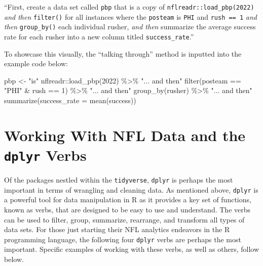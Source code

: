 \documentclass[
  letterpaper,
]{krantz}
\newenvironment{Shaded}{\begin{snugshade}}{\end{snugshade}}
\newcommand{\AttributeTok}[1]{\textcolor[rgb]{0.40,0.45,0.13}{#1}}
\newcommand{\DecValTok}[1]{\textcolor[rgb]{0.68,0.00,0.00}{#1}}
\newcommand{\FunctionTok}[1]{\textcolor[rgb]{0.28,0.35,0.67}{#1}}
\newcommand{\NormalTok}[1]{\textcolor[rgb]{0.00,0.23,0.31}{#1}}
\newcommand{\OtherTok}[1]{\textcolor[rgb]{0.00,0.23,0.31}{#1}}
\newcommand{\SpecialCharTok}[1]{\textcolor[rgb]{0.37,0.37,0.37}{#1}}
\newcommand{\StringTok}[1]{\textcolor[rgb]{0.13,0.47,0.30}{#1}}
\begin{document}
``First, create a data set called \texttt{pbp} that is a copy of
\texttt{nflreadr::load\_pbp(2022)} \emph{and then} \texttt{filter()} for
all instances where the \texttt{posteam} is \texttt{PHI} and
\texttt{rush\ ==\ 1} \emph{and then} \texttt{group\_by()} each
individual rusher, \emph{and then} summarize the average success rate
for each rusher into a new column titled \texttt{success\_rate}.''

To showcase this visually, the ``talking through'' method is inputted
into the example code below:

\begin{Shaded}
\begin{Highlighting}[]
\NormalTok{pbp }\OtherTok{\textless{}{-}} \StringTok{"is"}\NormalTok{ nflreadr}\SpecialCharTok{::}\FunctionTok{load\_pbp}\NormalTok{(}\DecValTok{2022}\NormalTok{) }\SpecialCharTok{\%\textgreater{}\%} \StringTok{"... and then"}
  \FunctionTok{filter}\NormalTok{(posteam }\SpecialCharTok{==} \StringTok{"PHI"} \SpecialCharTok{\&}\NormalTok{ rush }\SpecialCharTok{==} \DecValTok{1}\NormalTok{) }\SpecialCharTok{\%\textgreater{}\%} \StringTok{"... and then"}
  \FunctionTok{group\_by}\NormalTok{(rusher) }\SpecialCharTok{\%\textgreater{}\%} \StringTok{"... and then"}
  \FunctionTok{summarize}\NormalTok{(}\AttributeTok{success\_rate =} \FunctionTok{mean}\NormalTok{(success))}
\end{Highlighting}
\end{Shaded}

\hypertarget{working-with-nfl-data-and-the-dplyr-verbs}{%
\section{\texorpdfstring{Working With NFL Data and the \texttt{dplyr}
Verbs}{Working With NFL Data and the dplyr Verbs}}\label{working-with-nfl-data-and-the-dplyr-verbs}}

Of the packages nestled within the \texttt{tidyverse}, \texttt{dplyr} is
perhaps the most important in terms of wrangling and cleaning data. As
mentioned above, \texttt{dplyr} is a powerful tool for data manipulation
in R as it provides a key set of functions, known as verbs, that are
designed to be easy to use and understand. The verbs can be used to
filter, group, summarize, rearrange, and transform all types of data
sets. For those just starting their NFL analytics endeavors in the R
programming language, the following four \texttt{dplyr} verbs are
perhaps the most important. Specific examples of working with these
verbs, as well as others, follow below.
\end{document}
